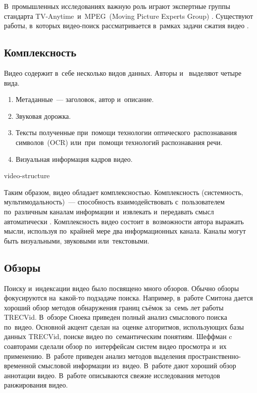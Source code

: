В~промышленных исследованиях важную роль играют экспертные группы
стандарта TV-Anytime\ и~MPEG~(Moving
Picture Experts Group) \cite{Pereira:2008}.
Существуют работы, в~которых видео-поиск рассматривается
в~рамках задачи сжатия видео \cite{Babu:2007}.


\subsection{Комплексность}

Видео содержит в~себе несколько видов данных.
Авторы \cite{Chung:2007:PAU} и~\cite{smeaton:2006} выделяют четыре вида.
\begin{enumerate}
    \item   Метаданные~— заголовок, автор и~описание.
    \item   Звуковая дорожка.
    \item   Тексты полученные при~помощи технологии
            оптического\
            распознавания символов\
            (OCR) или~при~помощи технологий
            распознавания речи\index{Распознавание! речи}.
    \item   Визуальная информация кадров видео.
\end{enumerate}


\begin{figuredt}
    {video-structure}
\end{figuredt}

Таким образом, видео обладает комплексностью.
Комплексность (системность, мультимодальность)~— способность взаимодействовать
с~пользователем по~различным каналам информации
и~извлекать и~передавать смысл автоматически \cite{Nigay:1993}.
Комплексность видео состоит в~возможности автора выражать мысли,
используя по~крайней мере два информационных канала.
Каналы могут быть визуальными, звуковыми или~текстовыми.


\subsection{Обзоры}

Поиску и~индексации видео было посвящено много обзоров.
Обычно обзоры фокусируются на~какой-то подзадаче поиска.
Например, в~работе Смитона \cite{Smeaton:2010} дается хороший обзор
методов обнаружения границ съёмок за~семь лет работы TRECVid.
В~обзоре Сноека \cite{Snoek:2009} приведен
полный анализ смыслового поиска по~видео.
Основной акцент сделан на~оценке алгоритмов,
использующих базы данных TRECVid,
поиске видео по~семантическим понятиям.
Шеффман c соавторами \cite{Schoeffmann:2010} сделали
обзор по~интерфейсам систем видео просмотра и~их применению.
В~работе \cite{Ren:2009} приведен анализ методов
выделения пространственно-временной смысловой информации из~видео.
В~работе \cite{Zhang:2012} дают хороший обзор аннотации видео.
В~работе \cite{XinmieTian:2011} описываются свежие исследования
методов ранжирования видео.



